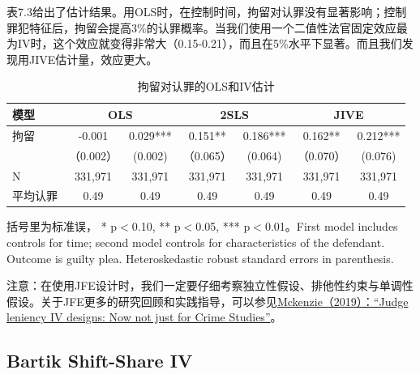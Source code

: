 \documentclass[cn,12pt,math=newtx,citestyle=gb7714-2015,bibstyle=gb7714-2015]{elegantbook}
\begin{document}
	表7.3给出了估计结果。用OLS时，在控制时间，拘留对认罪没有显著影响；控制罪犯特征后，拘留会提高3\%的认罪概率。当我们使用一个二值性法官固定效应最为IV时，这个效应就变得非常大（0.15-0.21），而且在5\%水平下显著。而且我们发现用JIVE估计量，效应更大。
	
	
		\begin{table}[htbp]\centering
		\scriptsize
		\caption{拘留对认罪的OLS和IV估计}
		\label{2sls_3}
		\begin{center}
			\begin{threeparttable}
				\begin{tabular}{lcccccc}
					\toprule
					\multicolumn{1}{l}{模型}&
					\multicolumn{2}{c}{\textbf{OLS}} &\multicolumn{2}{c}{\textbf{2SLS}}&\multicolumn{2}{c}{\textbf{JIVE}}\\
					\midrule
					拘留                &       -0.001&       0.029***&0.151**&0.186***&0.162**&0.212*** \\
					&   （0.002）    &     (0.002)  &（0.065）&(0.064)&（0.070）&(0.076) \\
					N& 331,971&331,971&	331,971	&331,971&	331,971	&331,971   \\
					平均认罪&0.49&	0.49	&0.49&	0.49&	0.49&	0.49
					\\
					
					\bottomrule
				\end{tabular}
				\begin{tablenotes}
					\tiny
					\item 括号里为标准误， * p$<$0.10, ** p$<$0.05, *** p$<$0.01。First model includes controls for time; second model controls for characteristics of the defendant. Outcome is guilty plea. Heteroskedastic robust standard errors in parenthesis. 
				\end{tablenotes}
			\end{threeparttable}
		\end{center}
	\end{table}
	
	注意：在使用JFE设计时，我们一定要仔细考察独立性假设、排他性约束与单调性假设。关于JFE更多的研究回顾和实践指导，可以参见\href{https://blogs.worldbank.org/impactevaluations/judge-leniency-iv-designs-now-not-just-crime-studies}{Mckenzie（2019）：“Judge leniency IV designs: Now not just for Crime Studies”}。
	
	
	
	\subsection{Bartik Shift-Share IV}
	
\end{document}
